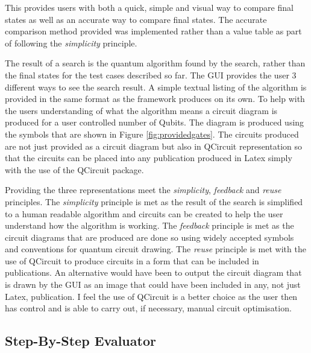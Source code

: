 This provides users with both a quick, simple and visual way to compare final states as well as an accurate way to compare final states.
The accurate comparison method provided was implemented rather than a value table as part of following the \emph{simplicity} principle.

The result of a search is the quantum algorithm found by the search, rather than the final states for the test cases described so far.
The GUI provides the user 3 different ways to see the search result.
A simple textual listing of the algorithm is provided in the same format as the framework produces on its own.
To help with the users understanding of what the algorithm means a circuit diagram is produced for a user controlled number of Qubits.
The diagram is produced using the symbols that are shown in Figure \ref{fig:providedgates}.
The circuits produced are not just provided as a circuit diagram but also in QCircuit representation so that the circuits can be placed into any publication produced in Latex simply with the use of the QCircuit package.

Providing the three representations meet the \emph{simplicity}, \emph{feedback} and \emph{reuse} principles.
The \emph{simplicity} principle is met as the result of the search is simplified to a human readable algorithm and circuits can be created to help the user understand how the algorithm is working.
The \emph{feedback} principle is met as the circuit diagrams that are produced are done so using widely accepted symbols and conventions for quantum circuit drawing.
The \emph{reuse} principle is met with the use of QCircuit to produce circuits in a form that can be included in publications.
An alternative would have been to output the circuit diagram that is drawn by the GUI as an image that could have been included in any, not just Latex, publication.
I feel the use of QCircuit is a better choice as the user then has control and is able to carry out, if necessary, manual circuit optimisation.

\subsection{Step-By-Step Evaluator}
\label{sec:sbse}

